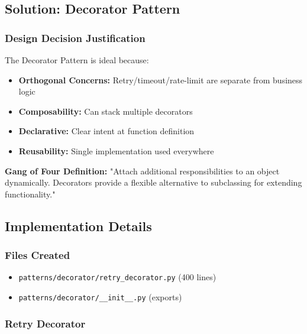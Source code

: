 \documentclass[11pt,a4paper]{article}
\begin{document}
\subsection{Solution: Decorator Pattern}

\subsubsection{Design Decision Justification}

The Decorator Pattern is ideal because:

\begin{itemize}
    \item \textbf{Orthogonal Concerns:} Retry/timeout/rate-limit are separate from business logic
    \item \textbf{Composability:} Can stack multiple decorators
    \item \textbf{Declarative:} Clear intent at function definition
    \item \textbf{Reusability:} Single implementation used everywhere
\end{itemize}

\textbf{Gang of Four Definition:} "Attach additional responsibilities to an object dynamically. Decorators provide a flexible alternative to subclassing for extending functionality."

\subsection{Implementation Details}

\subsubsection{Files Created}

\begin{itemize}
    \item \texttt{patterns/decorator/retry\_decorator.py} (400 lines)
    \item \texttt{patterns/decorator/\_\_init\_\_.py} (exports)
\end{itemize}

\subsubsection{Retry Decorator}
\end{document}
